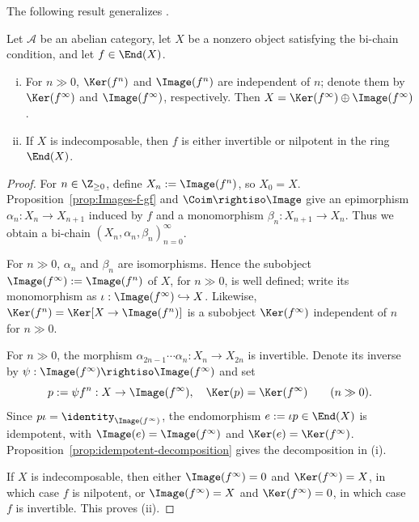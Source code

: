The following result generalizes \cite[Lemma 6.11.5]{Li1}.
\begin{lemma}\label{prop:Abel-cat-Fitting}
	Let $\mathcal{A}$ be an abelian category, let $X$ be a nonzero object
	satisfying the bi-chain condition, and let $f\in\End(X)$.
	\begin{enumerate}[(i)]
		\item For $n\gg0$, $\Ker(f^n)$ and $\Image(f^n)$ are independent of
		$n$; denote them by $\Ker(f^\infty)$ and $\Image(f^\infty)$,
		respectively. Then
		$X=\Ker(f^\infty)\oplus\Image(f^\infty)$.
		\item If $X$ is indecomposable, then $f$ is either invertible or
		nilpotent in the ring $\End(X)$.
	\end{enumerate}
\end{lemma}
\begin{proof}
	For $n\in\Z_{\geq0}$, define $X_n:=\Image(f^n)$, so $X_0=X$.
	Proposition~\ref{prop:Images-f-gf} and $\Coim\rightiso\Image$ give an
	epimorphism $\alpha_n:X_n\to X_{n+1}$ induced by $f$ and a monomorphism
	$\beta_n:X_{n+1}\to X_n$. Thus we obtain a bi-chain
	$(X_n,\alpha_n,\beta_n)_{n=0}^\infty$.

	For $n\gg0$, $\alpha_n$ and $\beta_n$ are isomorphisms. Hence the
	subobject $\Image(f^\infty):=\Image(f^n)$ of $X$, for $n\gg0$, is well
	defined; write its monomorphism as
	$\iota:\Image(f^\infty)\hookrightarrow X$. Likewise,
	$\Ker(f^n)=\Ker[X\to\Image(f^n)]$ is a subobject $\Ker(f^\infty)$
	independent of $n$ for $n\gg0$.

	For $n\gg0$, the morphism
	$\alpha_{2n-1}\cdots\alpha_n:X_n\to X_{2n}$ is invertible. Denote its
	inverse by
	$\psi:\Image(f^\infty)\rightiso\Image(f^\infty)$ and set
	\[ p := \psi f^n: X \to \Image(f^\infty), \quad \Ker(p) = \Ker(f^\infty) \qquad (n \gg 0). \]
	Since $p\iota=\identity_{\Image(f^\infty)}$, the endomorphism
	$e:=\iota p\in\End(X)$ is idempotent, with
	$\Image(e)=\Image(f^\infty)$ and $\Ker(e)=\Ker(f^\infty)$.
	Proposition~\ref{prop:idempotent-decomposition} gives the decomposition in
	(i).

	If $X$ is indecomposable, then either $\Image(f^\infty)=0$ and
	$\Ker(f^\infty)=X$, in which case $f$ is nilpotent, or
	$\Image(f^\infty)=X$ and $\Ker(f^\infty)=0$, in which case $f$ is
	invertible. This proves (ii).
\end{proof}

